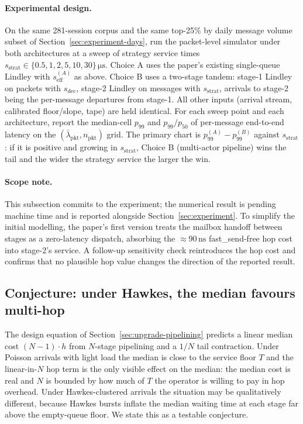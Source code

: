 \documentclass[11pt]{article}
\begin{document}
\paragraph{Experimental design.} On the same 281-session corpus and the same top-25\% by daily message volume subset of Section~\ref{sec:experiment-days}, run the packet-level simulator under both architectures at a sweep of strategy service times $s_{\mathrm{strat}} \in \{0.5, 1, 2, 5, 10, 30\}\,\si{\micro\second}$. Choice A uses the paper's existing single-queue Lindley with $s_{\mathrm{eff}}^{(A)}$ as above. Choice B uses a two-stage tandem: stage-1 Lindley on packets with $s_{\mathrm{dec}}$, stage-2 Lindley on messages with $s_{\mathrm{strat}}$, arrivals to stage-2 being the per-message departures from stage-1. All other inputs (arrival stream, calibrated floor/slope, tape) are held identical. For each sweep point and each architecture, report the median-cell $p_{99}$ and $p_{99}/p_{50}$ of per-message end-to-end latency on the $(\bar\lambda_{\mathrm{pkt}}, n_{\mathrm{pkt}})$ grid. The primary chart is $p_{99}^{(A)} - p_{99}^{(B)}$ against $s_{\mathrm{strat}}$: if it is positive and growing in $s_{\mathrm{strat}}$, Choice B (multi-actor pipeline) wins the tail and the wider the strategy service the larger the win.

\paragraph{Scope note.} This subsection commits to the experiment; the numerical result is pending machine time and is reported alongside Section~\ref{sec:experiment}. To simplify the initial modelling, the paper's first version treats the mailbox handoff between stages as a zero-latency dispatch, absorbing the $\approx 90\,\mathrm{ns}$ fast\_send-free hop cost into stage-2's service. A follow-up sensitivity check reintroduces the hop cost and confirms that no plausible hop value changes the direction of the reported result.

\subsection{Conjecture: under Hawkes, the median favours multi-hop}
\label{sec:median-hawkes-conjecture}

The design equation of Section~\ref{sec:upgrade-pipelining} predicts a linear median cost $(N-1)\cdot h$ from $N$-stage pipelining and a $1/N$ tail contraction. Under Poisson arrivals with light load the median is close to the service floor $T$ and the linear-in-$N$ hop term is the only visible effect on the median: the median cost is real and $N$ is bounded by how much of $T$ the operator is willing to pay in hop overhead. Under Hawkes-clustered arrivals the situation may be qualitatively different, because Hawkes bursts inflate the median waiting time at each stage far above the empty-queue floor. We state this as a testable conjecture.
\end{document}
